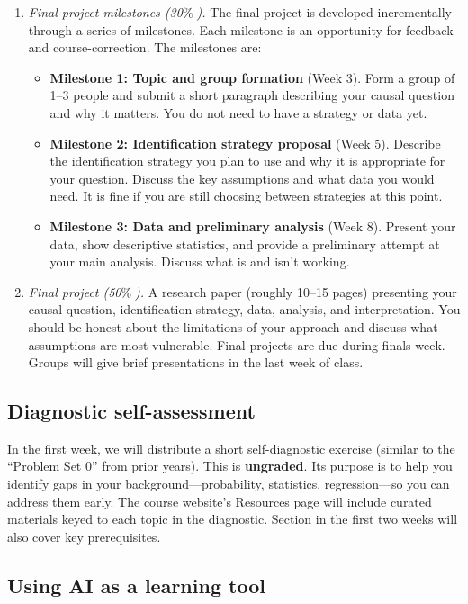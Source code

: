 \documentclass[PS]{syllabus}
\newcommand{\percent}{\ensuremath{\%\;}}
\begin{document}
\begin{syllabus}
\begin{enumerate}
\item \emph{Final project milestones (30\percent).} The final project is developed incrementally through a series of milestones. Each milestone is an opportunity for feedback and course-correction. The milestones are:
\begin{itemize}
\item \textbf{Milestone 1: Topic and group formation} (Week 3). Form a group of 1--3 people and submit a short paragraph describing your causal question and why it matters. You do not need to have a strategy or data yet.
\item \textbf{Milestone 2: Identification strategy proposal} (Week 5). Describe the identification strategy you plan to use and why it is appropriate for your question. Discuss the key assumptions and what data you would need. It is fine if you are still choosing between strategies at this point.
\item \textbf{Milestone 3: Data and preliminary analysis} (Week 8). Present your data, show descriptive statistics, and provide a preliminary attempt at your main analysis. Discuss what is and isn't working.
\end{itemize}

\item \emph{Final project (50\percent).} A research paper (roughly 10--15 pages) presenting your causal question, identification strategy, data, analysis, and interpretation. You should be honest about the limitations of your approach and discuss what assumptions are most vulnerable. Final projects are due during finals week. Groups will give brief presentations in the last week of class.

\end{enumerate}

\subsection*{Diagnostic self-assessment}

In the first week, we will distribute a short self-diagnostic exercise (similar to the ``Problem Set 0'' from prior years). This is \textbf{ungraded}. Its purpose is to help you identify gaps in your background---probability, statistics, regression---so you can address them early. The course website's Resources page will include curated materials keyed to each topic in the diagnostic. Section in the first two weeks will also cover key prerequisites.

\subsection*{Using AI as a learning tool}


\end{syllabus}
\end{document}
